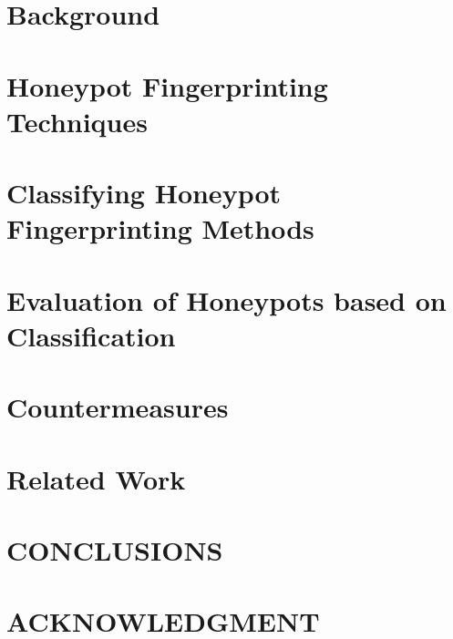 \documentclass[letterpaper, 10 pt, conference]{ieeeconf}  %
\begin{document}
\section{Background}


\section{Honeypot Fingerprinting Techniques}


\section{Classifying Honeypot Fingerprinting Methods}
   

\section{Evaluation of Honeypots based on Classification}
 
 
\section {Countermeasures}

 
\section {Related Work}
 
 
\section{CONCLUSIONS}


\addtolength{\textheight}{-12cm}   %

\section*{ACKNOWLEDGMENT}



\end{document}
